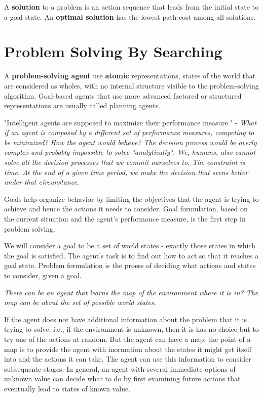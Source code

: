 \documentclass{article}
\begin{document}
A \textbf{solution} to a problem is an action sequence that leads from the initial state to a goal state. An \textbf{optimal solution} has the lowest path cost among all solutions.


\section{Problem Solving By Searching}

A \textbf{problem-solving agent} use \textbf{atomic} representations, states of the world that are considered as wholes, with no internal structure visible to the problem-solving algorithm. Goal-based agents that use more advanced factored or structured representations are usually called planning agents.

"Intelligent agents are supposed to maximize their performance measure." - \textit{What if an agent is composed by a different set of performance measures, competing to be minimized? How the agent would behave? The decision process would be overly complex and probably impossible to solve "analytically". We, humans, also cannot solve all the decision processes that we commit ourselves to. The constraint is time. At the end of a given time period, we make the decision that seens better under that circunstance.}

Goals help organize behavior by limiting the objectives that the agent is trying to achieve and hence the actions it needs to consider. Goal formulation, based on the current situation and the agent's performance measure, is the first step in problem solving.

We will consider a goal to be a set of world states - exactly those states in which the goal is satisfied. The agent's task is to find out how to act so that it reaches a goal state. Problem formulation is the proess of deciding what actions and states to consider, given a goal.


\noindent \textit{There can be an agent that learns the map of the environment where it is in? The map can be about the set of possible world states.}

If the agent does not have additional information about the problem that it is trying to solve, i.e., if the environment is unknown, then it is has no choice but to try one of the actions at random. But the agent can have a map; the point of a map is to provide the agent with inormation about the states it might get itself into and the actions it can take. The agent can use this information to consider subsequente stages. In general, an agent with several immediate options of unknown value can decide what to do by first examining future actions that eventually lead to states of known value.
\end{document}
